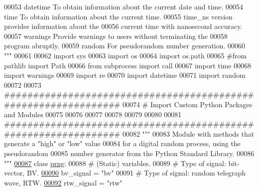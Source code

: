 \begin{DoxyCode}
00053 \textcolor{stringliteral}{    datetime    To obtain information about the current date and time.}
00054 \textcolor{stringliteral}{    time        To obtain information about the current time.}
00055 \textcolor{stringliteral}{                time\_ns version provides information about the}
00056 \textcolor{stringliteral}{                    current time with nanosecond accuracy.}
00057 \textcolor{stringliteral}{    warnings    Provide warnings to users without terminating the}
00058 \textcolor{stringliteral}{                    program abruptly.}
00059 \textcolor{stringliteral}{    random      For pseudorandom number generation.}
00060 \textcolor{stringliteral}{"""}
00061 
00062 \textcolor{keyword}{import} sys
00063 \textcolor{keyword}{import} os
00064 \textcolor{keyword}{import} os.path
00065 \textcolor{comment}{#from pathlib import Path}
00066 \textcolor{keyword}{from} subprocess \textcolor{keyword}{import} call
00067 \textcolor{keyword}{import} time
00068 \textcolor{keyword}{import} warnings
00069 \textcolor{keyword}{import} re
00070 \textcolor{keyword}{import} datetime
00071 \textcolor{keyword}{import} random
00072 
00073 \textcolor{comment}{###############################################################}
00074 \textcolor{comment}{#   Import Custom Python Packages and Modules}
00075 
00076 
00077 
00078 
00079 
00080 
00081 \textcolor{comment}{###############################################################}
00082 \textcolor{stringliteral}{"""}
00083 \textcolor{stringliteral}{    Module with methods that generate a "high" or "low" value}
00084 \textcolor{stringliteral}{        for a digital random process, using the pseudorandom}
00085 \textcolor{stringliteral}{        number generator from the Python Standard Library.}
00086 \textcolor{stringliteral}{"""}
\hypertarget{pseudorandom__number__generator_8py_source_l00087}{}\hyperlink{classrandom__process__models_1_1pseudorandom__number__generator_1_1prng}{00087} \textcolor{keyword}{class }\hyperlink{classrandom__process__models_1_1pseudorandom__number__generator_1_1prng}{prng}:
00088     \textcolor{comment}{# (Static) variables.}
00089     \textcolor{comment}{# Type of signal: bit-vector, BV.}
\hypertarget{pseudorandom__number__generator_8py_source_l00090}{}\hyperlink{classrandom__process__models_1_1pseudorandom__number__generator_1_1prng_a82f57253641d85b4e2efba66fac47066}{00090}     bv\_signal = \textcolor{stringliteral}{"bv"}
00091     \textcolor{comment}{# Type of signal: random telegraph wave, RTW.}
\hypertarget{pseudorandom__number__generator_8py_source_l00092}{}\hyperlink{classrandom__process__models_1_1pseudorandom__number__generator_1_1prng_a6962172d81af8d6c172ba64e33eb0d55}{00092}     rtw\_signal = \textcolor{stringliteral}{"rtw"}

\end{DoxyCode}
